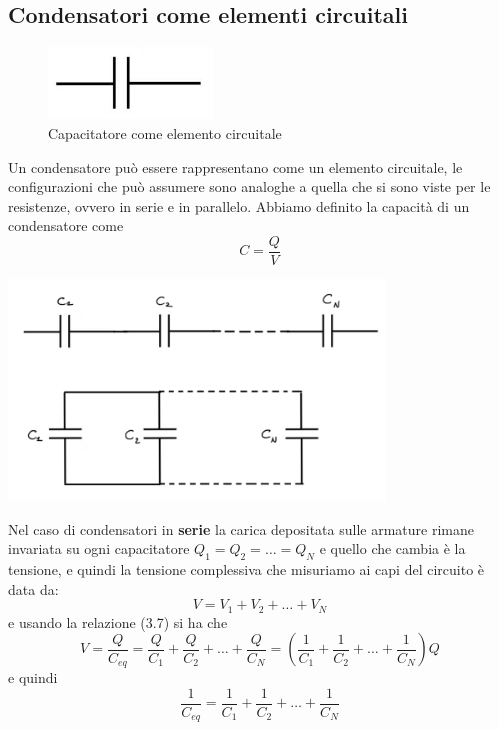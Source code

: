 \subsection{Condensatori come elementi circuitali}
 \begin{figure}
  \centering
  \includegraphics[width=0.39\textwidth]{images/cap}
  \caption{Capacitatore come elemento circuitale}
\end{figure}
Un condensatore pu\`o essere rappresentano come un elemento circuitale, le configurazioni che pu\`o assumere sono analoghe a quella che si sono viste per le resistenze, ovvero in serie e in parallelo. Abbiamo definito la capacit\`a di un condensatore come 
\begin{equation}
	C = \frac{Q}{V}
\end{equation}
\begin{center}
	\includegraphics[width = 10cm]{images/cap_par_ser}
\end{center}
Nel caso di condensatori in \textbf{serie} la carica depositata sulle armature rimane invariata su ogni capacitatore $Q_1 = Q_2 =\ldots = Q_{N}$ e quello che cambia \`e la tensione, e quindi la tensione complessiva che misuriamo ai capi del circuito \`e data da:
\begin{equation*}
	V = V_{1} + V_{2} + \ldots + V_{N}
\end{equation*}
e usando la relazione (3.7) si ha che 
\begin{equation*}
	V = \frac{Q}{C_{eq}}= \frac{Q}{C_{1}} + \frac{Q}{C_{2}} + \ldots + \frac{Q}{C_{N}} = \left(\frac{1}{C_{1}} + \frac{1}{C_{2}} + \ldots + \frac{1}{C_{N}}\right)Q
\end{equation*}
e quindi 
\begin{equation}
	\frac{1}{C_{eq}} = \frac{1}{C_{1}} + \frac{1}{C_{2}} + \ldots + \frac{1}{C_{N}}
\end{equation}
